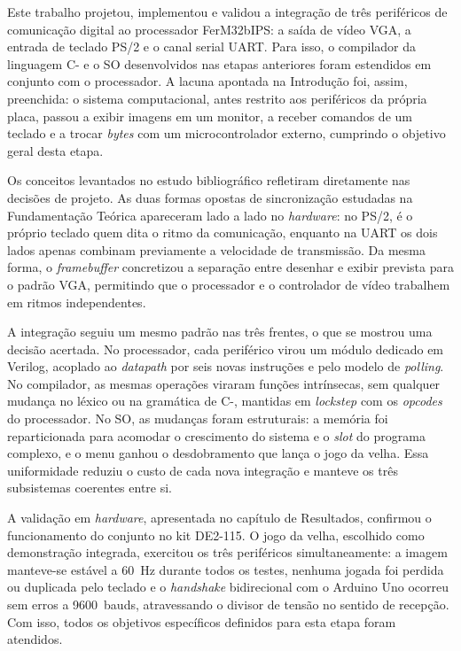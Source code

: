 \documentclass[
	12pt,
	oneside,
	a4paper,
	english,
	french,
	spanish,
	brazil,
	]{abntex2}
\begin{document}
Este trabalho projetou, implementou e validou a integração de três periféricos de comunicação digital ao processador FerM32bIPS: a saída de vídeo VGA, a entrada de teclado PS/2 e o canal serial UART. Para isso, o compilador da linguagem C- e o SO desenvolvidos nas etapas anteriores foram estendidos em conjunto com o processador. A lacuna apontada na Introdução foi, assim, preenchida: o sistema computacional, antes restrito aos periféricos da própria placa, passou a exibir imagens em um monitor, a receber comandos de um teclado e a trocar \emph{bytes} com um microcontrolador externo, cumprindo o objetivo geral desta etapa.

Os conceitos levantados no estudo bibliográfico refletiram diretamente nas decisões de projeto. As duas formas opostas de sincronização estudadas na Fundamentação Teórica apareceram lado a lado no \emph{hardware}: no PS/2, é o próprio teclado quem dita o ritmo da comunicação, enquanto na UART os dois lados apenas combinam previamente a velocidade de transmissão. Da mesma forma, o \emph{framebuffer} concretizou a separação entre desenhar e exibir prevista para o padrão VGA, permitindo que o processador e o controlador de vídeo trabalhem em ritmos independentes.

A integração seguiu um mesmo padrão nas três frentes, o que se mostrou uma decisão acertada. No processador, cada periférico virou um módulo dedicado em Verilog, acoplado ao \emph{datapath} por seis novas instruções e pelo modelo de \emph{polling}. No compilador, as mesmas operações viraram funções intrínsecas, sem qualquer mudança no léxico ou na gramática de C-, mantidas em \emph{lockstep} com os \emph{opcodes} do processador. No SO, as mudanças foram estruturais: a memória foi reparticionada para acomodar o crescimento do sistema e o \emph{slot} do programa complexo, e o menu ganhou o desdobramento que lança o jogo da velha. Essa uniformidade reduziu o custo de cada nova integração e manteve os três subsistemas coerentes entre si.

A validação em \emph{hardware}, apresentada no capítulo de Resultados, confirmou o funcionamento do conjunto no kit DE2-115. O jogo da velha, escolhido como demonstração integrada, exercitou os três periféricos simultaneamente: a imagem manteve-se estável a 60~Hz durante todos os testes, nenhuma jogada foi perdida ou duplicada pelo teclado e o \emph{handshake} bidirecional com o Arduino Uno ocorreu sem erros a 9600~bauds, atravessando o divisor de tensão no sentido de recepção. Com isso, todos os objetivos específicos definidos para esta etapa foram atendidos.
\end{document}
